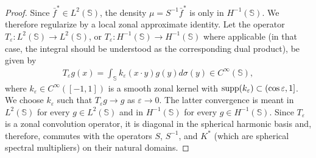\documentclass[a4paper, 11pt]{article}
\renewcommand{\SS}{\mathbb{S}}
\begin{document}
\begin{proof}
Since $\bar f^{\ast}\in L^2(\SS)$, the density $\mu=S^{-1}\bar f^{\ast}$ is only in $H^{-1}(\SS)$.  We therefore regularize by a local zonal approximate identity. Let the operator $T_\varepsilon:L^2(\SS)\to L^2(\SS)$, or $T_\varepsilon:H^{-1}(\SS)\to H^{-1}(\SS)$ where applicable (in that case, the integral should be understood as the corresponding dual product), be given by
\begin{align}
	T_\varepsilon g(x)=\int_\SS k_\varepsilon(x\cdot y) g(y)d\sigma(y)\in C^\infty(\SS),\label{eqn:tepsrep}
\end{align} 
where $k_\varepsilon\in C^\infty([-1,1])$ is a smooth zonal kernel with $\textnormal{supp}(k_\varepsilon)\subset(\cos \varepsilon,1]$. 
We choose $k_\varepsilon$ such that $T_\varepsilon g\to g$ as $\varepsilon\to 0$. The latter convergence is meant in $L^2(\SS)$ for every $g\in L^2(\SS)$ and in $H^{-1}(\SS)$ for every $g\in H^{-1}(\SS)$. Since $T_\varepsilon$ is a zonal convolution operator, it is diagonal in the spherical harmonic basis and, therefore, commutes with the operators $S$, $S^{-1}$, and $K^\ast$ (which are spherical spectral multipliers) on their natural  domains.


\end{proof}
\end{document}
